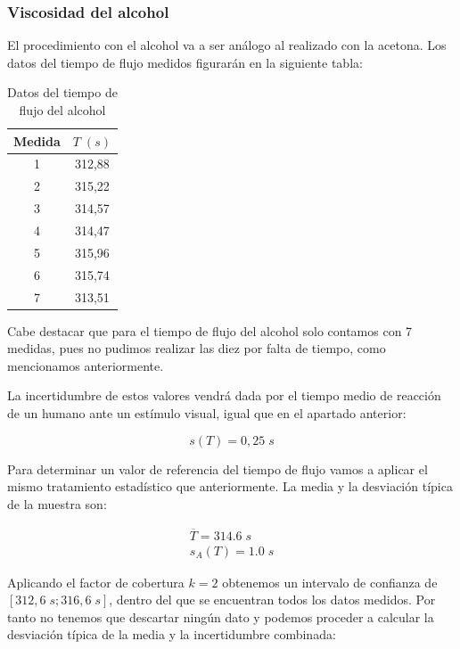 \documentclass[a4paper,12pt,titlepage]{report}
\begin{document}
\subsubsection{Viscosidad del alcohol}

El procedimiento con el alcohol va a ser análogo al realizado con la acetona. Los datos del tiempo de flujo medidos figurarán en la siguiente tabla:

\begin{table}[h!]
    \centering
    \begin{tabular}{|c|c|}
    \hline
    Medida  & $T \;(s)$ \\ \hline
    1 & 312,88 \\ \hline
    2 & 315,22 \\ \hline
    3 & 314,57 \\ \hline
    4 & 314,47 \\ \hline
    5 & 315,96 \\ \hline
    6 & 315,74 \\ \hline
    7 & 313,51 \\ \hline
    \end{tabular}
    \caption{Datos del tiempo de flujo del alcohol}
    \label{T alcohol}
    \end{table}

Cabe destacar que para el tiempo de flujo del alcohol solo contamos con 7 medidas, pues no pudimos realizar las diez por falta de tiempo, como mencionamos anteriormente.

\par La incertidumbre de estos valores vendrá dada por el tiempo medio de reacción de un humano ante un estímulo visual, igual que en el apartado anterior:

\begin{equation}
    s(T) = 0,25 \; s
\end{equation}    

Para determinar un valor de referencia del tiempo de flujo vamos a aplicar el mismo tratamiento estadístico que anteriormente. La media y la desviación típica de la muestra son:

\begin{equation}
    \begin{gathered}
        \overline{T} = 314.6\; s\\
        s_A(T) =  1.0 \; s
    \end{gathered}
\end{equation}

Aplicando el factor de cobertura $k=2$ obtenemos un intervalo de confianza de $[312,6 \;s;316,6\; s]$, dentro del que se encuentran todos los datos medidos. Por tanto no tenemos que descartar ningún dato y podemos proceder a calcular la desviación típica de la media y la incertidumbre combinada:
\end{document}
